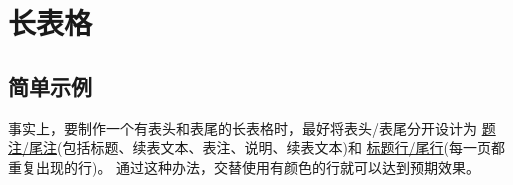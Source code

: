 \documentclass[oneside]{book}
\begin{document}
\chapter{长表格}
\label{chap:long}


\section{简单示例}

事实上，要制作一个有表头和表尾的长表格时，最好将表头/表尾分开设计为
\underline{题注/尾注}(包括标题、续表文本、表注、说明、续表文本)和
\underline{标题行/尾行}(每一页都重复出现的行)。
通过这种办法，交替使用有颜色的行就可以达到预期效果。
\end{document}
